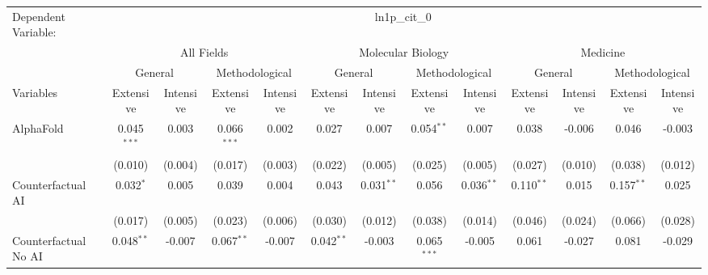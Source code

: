 \begingroup
\centering
\begin{tabular}{lcccccccccccc}
   \tabularnewline \midrule \midrule
   Dependent Variable: & \multicolumn{12}{c}{ln1p\_cit\_0}\\
 & \multicolumn{4}{c}{All Fields} & \multicolumn{4}{c}{Molecular Biology} & \multicolumn{4}{c}{Medicine} \\
\cmidrule(lr){2-5} \cmidrule(lr){6-9} \cmidrule(lr){10-13}
 & \multicolumn{2}{c}{General} & \multicolumn{2}{c}{Methodological} & \multicolumn{2}{c}{General} & \multicolumn{2}{c}{Methodological} & \multicolumn{2}{c}{General} & \multicolumn{2}{c}{Methodological} \\
\cmidrule(lr){2-3} \cmidrule(lr){4-5} \cmidrule(lr){6-7} \cmidrule(lr){8-9} \cmidrule(lr){10-11} \cmidrule(lr){12-13}
Variables & \multicolumn{1}{c}{Extensive} & \multicolumn{1}{c}{Intensive} & \multicolumn{1}{c}{Extensive} & \multicolumn{1}{c}{Intensive} & \multicolumn{1}{c}{Extensive} & \multicolumn{1}{c}{Intensive} & \multicolumn{1}{c}{Extensive} & \multicolumn{1}{c}{Intensive} & \multicolumn{1}{c}{Extensive} & \multicolumn{1}{c}{Intensive} & \multicolumn{1}{c}{Extensive} & \multicolumn{1}{c}{Intensive} \\
\cmidrule(lr){1-1}\cmidrule(lr){2-2} \cmidrule(lr){3-3} \cmidrule(lr){4-4} \cmidrule(lr){5-5} \cmidrule(lr){6-6} \cmidrule(lr){7-7} \cmidrule(lr){8-8} \cmidrule(lr){9-9} \cmidrule(lr){10-10} \cmidrule(lr){11-11} \cmidrule(lr){12-12} \cmidrule(lr){13-13}
   AlphaFold                                & 0.045$^{***}$ & 0.003          & 0.066$^{***}$ & 0.002          & 0.027        & 0.007           & 0.054$^{**}$   & 0.007        & 0.038        & -0.006  & 0.046        & -0.003\\   
                                            & (0.010)       & (0.004)        & (0.017)       & (0.003)        & (0.022)      & (0.005)         & (0.025)        & (0.005)      & (0.027)      & (0.010) & (0.038)      & (0.012)\\   
   Counterfactual AI                        & 0.032$^{*}$   & 0.005          & 0.039         & 0.004          & 0.043        & 0.031$^{**}$    & 0.056          & 0.036$^{**}$ & 0.110$^{**}$ & 0.015   & 0.157$^{**}$ & 0.025\\   
                                            & (0.017)       & (0.005)        & (0.023)       & (0.006)        & (0.030)      & (0.012)         & (0.038)        & (0.014)      & (0.046)      & (0.024) & (0.066)      & (0.028)\\   
   Counterfactual No AI                     & 0.048$^{**}$  & -0.007         & 0.067$^{**}$  & -0.007         & 0.042$^{**}$ & -0.003          & 0.065$^{***}$  & -0.005       & 0.061        & -0.027  & 0.081        & -0.029\\   

\end{tabular}
